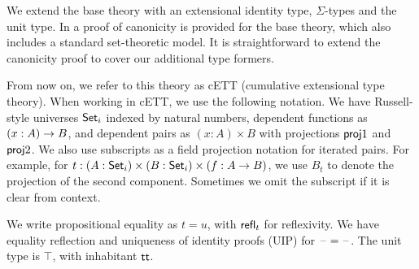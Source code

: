 \documentclass[sigplan,review,anonymous]{acmart}\settopmatter{printfolios=true,printccs=false,printacmref=false}
\begin{document}

We extend the base theory with an extensional identity type, $\Sigma$-types and
the unit type. In \cite{sterling2019algebraic} a proof of canonicity is provided for the base
theory, which also includes a standard set-theoretic model. It is
straightforward to extend the canonicity proof to cover our additional type
formers.

From now on, we refer to this theory as cETT (cumulative extensional type
theory). When working in cETT, we use the following notation. We have
Russell-style universes $\Set_i$ indexed by natural numbers, dependent functions
as $(x : A)\ra B$, and dependent pairs as $(x : A)\times B$ with projections
$\proj1$ and $\proj2$. We also use subscripts as a field projection notation for
iterated pairs. For example, for $t : (A : \Set_i) \times (B : \Set_i) \times (f
: A \ra B)$, we use $B_t$ to denote the projection of the second
component. Sometimes we omit the subscript if it is clear from context.

We write propositional equality as $t = u$, with $\refl_t$ for reflexivity. We
have equality reflection and uniqueness of identity proofs (UIP) for
$\blank=\blank$. The unit type is $\top$, with inhabitant $\tt$.
\end{document}
